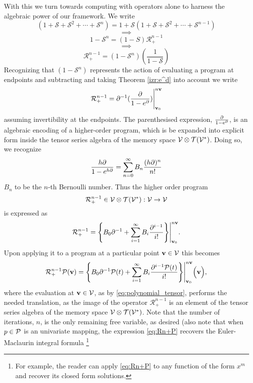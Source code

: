 With this we turn towards computing with operators alone to harness the algebraic power of our framework. We write
$$(1+\mathcal{S}+\mathcal{S}^2+\cdots+\mathcal{S}^n)=1+\mathcal{S}(1+\mathcal{S}+\mathcal{S}^2+\cdots+\mathcal{S}^{n-1})$$
   $$\implies$$
   $$1-\mathcal{S}^n=(1-S)\mathcal{R}^{n-1}_+$$
   $$\implies$$
  \begin{equation}
\mathcal{R}^{n-1}_+=(1-\mathcal{S}^n)(\frac{1}{1-\mathcal{S}})
  \end{equation}
Recognizing that $(1-\mathcal{S}^n)$ represents the action of evaluating a program at endpoints and subtracting and taking Theorem \ref{izr:e^d} into account we write
  \begin{equation}\label{eq:Rn+Basic}
    \mathcal{R}^{n-1}_+=\partial^{-1}(\frac{\partial}{1-e^\partial})\Bigg\vert_{\mathbf{v}_0}^{n\mathbf{v}}
  \end{equation}
assuming invertibility at the endpoints. The parenthesised expression, $\frac{\partial}{1-e^\partial}$, is an algebraic encoding of a higher-order program, which is be expanded into explicit form inside the tensor series algebra of the memory space $\mathcal{V}\otimes \mathcal{T}(\mathcal{V}^*)$. Doing so, we recognize
\begin{equation}
    	\frac{h\partial}{1-e^{h\partial}}=\sum\limits_{n=0}^{\infty}B_n\frac{(h\partial)^n}{n!}
    \end{equation}
$B_n$ to be the $n$-th Bernoulli number. Thus the higher order program
$$\mathcal{R}^{n-1}_+\in \mathcal{V}\otimes \mathcal{T}(\mathcal{V}^*):\mathcal{V}\to\mathcal{V}$$
is expressed as 
    \begin{equation}\label{eq:Rn+}
      \mathcal{R}^{n-1}_+=\Bigg\{B_0\partial^{-1}+\sum\limits_{i=1}^{\infty}B_i\frac{\partial^{i-1}}{i!}\Bigg\}\Bigg\vert_{\mathbf{v}_0}^{n\mathbf{v}}.
    \end{equation}
Upon applying it to a program at a particular point $\mathbf{v}\in \mathcal{V}$ this becomes
\begin{equation}\label{eq:Rn+P}
  \mathcal{R}^{n-1}_+\mathcal{P}(\mathbf{v})=\Bigg\{B_0\partial^{-1}\mathcal{P}(t)+\sum\limits_{i=1}^{\infty}B_i\frac{\partial^{i-1}\mathcal{P}(t)}{i!}\Bigg\}\Bigg\vert_{\mathbf{v}_0}^{n\mathbf{v}} \Big(\mathbf{v}\Big),
    \end{equation}
where the evaluation at $\mathbf{v}\in \mathcal{V}$, as by \eqref{eq:polynomial_tensor}, performs the needed translation, as the image of the operator $\mathcal{R}^{n-1}_+$ is an element of the tensor series algebra of the memory space $\mathcal{V}\otimes \mathcal{T}(\mathcal{V}^*)$.
Note that the number of iterations, $n$, is the only remaining free variable, as desired (also note that when $p\in\mathcal{P}$ is an univariate mapping, the expression \eqref{eq:Rn+P} recovers the Euler-Maclaurin integral formula
\footnote{For example, the reader can apply \eqref{eq:Rn+P} to any function of the form $x^m$ and recover its closed form solutions.}
